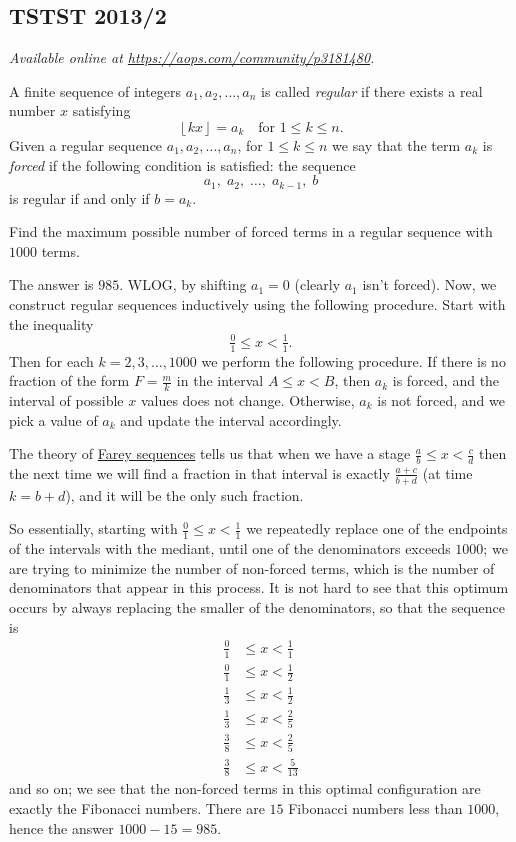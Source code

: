 \documentclass[11pt]{scrartcl}
\begin{document}
\subsection{TSTST 2013/2}
\textsl{Available online at \url{https://aops.com/community/p3181480}.}
\begin{mdframed}[style=mdpurplebox,frametitle={Problem statement}]
A finite sequence of integers $a_1, a_2, \dots, a_n$ is called
\emph{regular} if there exists a real number $x$ satisfying
\[ \left\lfloor kx \right\rfloor = a_k \quad \text{for } 1 \le k \le n. \]
Given a regular sequence $a_1, a_2, \dots, a_n$, for $1 \le k \le n$ we say that
the term $a_k$ is \emph{forced} if the following condition is satisfied:
the sequence \[ a_1, \; a_2, \; \dots, \; a_{k-1}, \; b \]
is regular if and only if $b = a_k$.

Find the maximum possible number of forced terms
in a regular sequence with $1000$ terms.
\end{mdframed}
The answer is $985$. WLOG, by shifting $a_1 = 0$ (clearly $a_1$ isn't forced).
Now, we construct regular sequences inductively using the following procedure.
Start with the inequality \[ \tfrac01 \le x < \tfrac11. \]
Then for each $k = 2, 3, \dots, 1000$ we perform the following procedure.
If there is no fraction of the form $F = \frac mk$ in the interval $A \le x < B$,
then $a_k$ is forced,
and the interval of possible $x$ values does not change.
Otherwise, $a_k$ is not forced,
and we pick a value of $a_k$ and update the interval accordingly.

The theory of \href{https://en.wikipedia.org/wiki/Farey_sequence}{Farey sequences}
tells us that when we have a stage $\tfrac ab \le x < \tfrac cd$
then the next time we will find a fraction
in that interval is exactly $\tfrac{a+c}{b+d}$ (at time $k=b+d$),
and it will be the only such fraction.

So essentially, starting with $\tfrac 01 \le x < \tfrac 11$
we repeatedly replace one of the endpoints of the intervals with the mediant,
until one of the denominators exceeds $1000$;
we are trying to minimize the number of non-forced terms,
which is the number of denominators that appear in this process.
It is not hard to see that this optimum occurs by always replacing the smaller of the denominators,
so that the sequence is
\begin{align*}
 \tfrac{0}{1} &\le x < \tfrac{1}{1} \\
 \tfrac{0}{1} &\le x < \tfrac{1}{2} \\
 \tfrac{1}{3} &\le x < \tfrac{1}{2} \\
 \tfrac{1}{3} &\le x < \tfrac{2}{5} \\
 \tfrac{3}{8} &\le x < \tfrac{2}{5} \\
 \tfrac{3}{8} &\le x < \tfrac{5}{13}
\end{align*}
and so on; we see that the non-forced terms in this optimal configuration
are exactly the Fibonacci numbers.
There are $15$ Fibonacci numbers less than $1000$,
hence the answer $1000 - 15 = 985$.
\pagebreak
\end{document}
